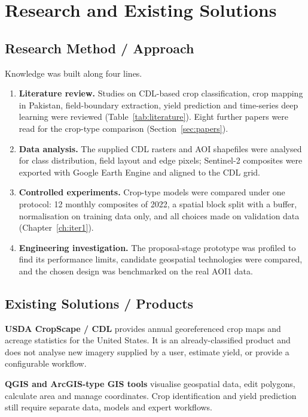 \chapter{Research and Existing Solutions}

\section{Research Method / Approach}
Knowledge was built along four lines.
\begin{enumerate}
  \item \textbf{Literature review.} Studies on CDL-based crop classification, crop mapping in
        Pakistan, field-boundary extraction, yield prediction and time-series deep learning were
        reviewed (Table~\ref{tab:literature}). Eight further papers were read for the crop-type
        comparison (Section~\ref{sec:papers}).
  \item \textbf{Data analysis.} The supplied CDL rasters and AOI shapefiles were analysed for class
        distribution, field layout and edge pixels; Sentinel-2 composites were exported with Google
        Earth Engine and aligned to the CDL grid.
  \item \textbf{Controlled experiments.} Crop-type models were compared under one protocol: 12
        monthly composites of 2022, a spatial block split with a buffer, normalisation on training
        data only, and all choices made on validation data (Chapter~\ref{ch:iter1}).
  \item \textbf{Engineering investigation.} The proposal-stage prototype was profiled to find its
        performance limits, candidate geospatial technologies were compared, and the chosen design
        was benchmarked on the real AOI1 data.
\end{enumerate}

\section{Existing Solutions / Products}
\textbf{USDA CropScape / CDL} provides annual georeferenced crop maps and acreage statistics for the
United States. It is an already-classified product and does not analyse new imagery supplied by a
user, estimate yield, or provide a configurable workflow.

\textbf{QGIS and ArcGIS-type GIS tools} visualise geospatial data, edit polygons, calculate area and
manage coordinates. Crop identification and yield prediction still require separate data, models and
expert workflows.

